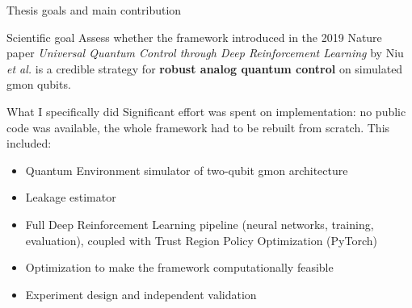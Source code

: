 \documentclass{beamer}
\begin{document}
\begin{frame}{Thesis goals and main contribution}
    \small
\begin{block}{Scientific goal}
Assess whether the framework introduced in the 2019 Nature paper 
\emph{Universal Quantum Control through Deep Reinforcement Learning}
by Niu \emph{et al.} is a credible strategy for
\textbf{robust analog quantum control} on simulated gmon qubits.
\end{block}

    \begin{block}{What I specifically did}
    Significant effort was spent on implementation: no public code was available, the whole framework had to be rebuilt from scratch. This included:
        \begin{itemize}
        \item Quantum Environment simulator of two-qubit gmon architecture  
        \item Leakage estimator
        \item Full Deep Reinforcement Learning pipeline (neural networks, training, evaluation), coupled with Trust Region Policy Optimization (PyTorch)
        \item Optimization to make the framework computationally feasible
        \item Experiment design and independent validation
    \end{itemize}
    \end{block}




\end{frame}
\end{document}
